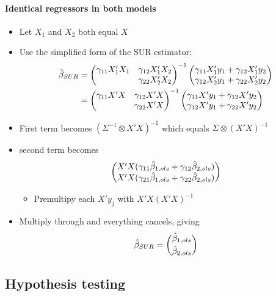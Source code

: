 \paragraph{Identical regressors in both models}
\begin{itemize}
\item Let $X_1$ and $X_2$ both equal $X$
\item Use the simplified form of the SUR estimator:
  \begin{align*}
    \hat{\beta}_{SUR}
    &= \begin{pmatrix}
      \gamma_{11} X_1'X_1 & \gamma_{12} X_1'X_2 \\ & \gamma_{22} X_2'X_2 
    \end{pmatrix}^{-1}
    \begin{pmatrix}
      \gamma_{11} X_1'y_1 + \gamma_{12} X_1'y_2 \\ \gamma_{12} X_2'y_1 + \gamma_{22} X_2'y_2
    \end{pmatrix} \\
    &= \begin{pmatrix}
      \gamma_{11} X'X & \gamma_{12} X'X \\ & \gamma_{22}X'X
    \end{pmatrix}^{-1}
    \begin{pmatrix}
      \gamma_{11} X'y_1 + \gamma_{12}X'y_2 \\ \gamma_{12} X'y_1 + \gamma_{22} X'y_2
    \end{pmatrix}
  \end{align*}
\item First term becomes $(\Sigma^{-1} \otimes X'X)^{-1}$ which equals
  $\Sigma \otimes (X'X)^{-1}$
\item second term becomes
  \[\begin{pmatrix}
    X'X (\gamma_{11}\hat{\beta}_{1,ols} + \gamma_{12}\hat{\beta}_{2,ols}) \\
    X'X (\gamma_{21}\hat{\beta}_{1,ols} + \gamma_{22}\hat{\beta}_{2,ols})
  \end{pmatrix}\]
\begin{itemize}
\item Premultipy each $X'y_j$ with $X'X(X'X)^{-1}$
\end{itemize}
\item Multiply through and everything cancels, giving
  \[\hat{\beta}_{SUR} = \binom{\hat{\beta}_{1,ols}}{\hat{\beta}_{2,ols}}\]
\end{itemize}

\subsection{Hypothesis testing}

